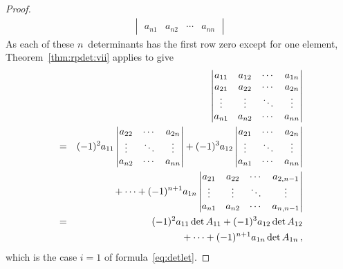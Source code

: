 \begin{proof}
\begin{eqnarray*}
\begin{vmatrix}
\\ a_{n1}&a_{n2}&\cdots&a_{nn}
\end{vmatrix}
\end{eqnarray*}
As each of these \(n\)~determinants has the first row zero except for one element,  Theorem~\ref{thm:rpdet:vii} applies to give
\begin{eqnarray*}
&&\hspace{-1em}
\begin{vmatrix} a_{11}&a_{12}&\cdots&a_{1n}
\\ a_{21}&a_{22}&\cdots&a_{2n}
\\ \vdots&\vdots&\ddots&\vdots
\\ a_{n1}&a_{n2}&\cdots&a_{nn}
\end{vmatrix}
\\&=&
(-1)^2a_{11}\begin{vmatrix} 
 a_{22}&\cdots&a_{2n}
\\ \vdots&\ddots&\vdots
\\ a_{n2}&\cdots&a_{nn}
\end{vmatrix}
+(-1)^3a_{12}\begin{vmatrix} 
 a_{21}&\cdots&a_{2n}
\\ \vdots&\ddots&\vdots
\\ a_{n1}&\cdots&a_{nn}
\end{vmatrix}
\\&&{}
+\cdots
+(-1)^{n+1}a_{1n}\begin{vmatrix}  
a_{21}&a_{22}&\cdots&a_{2,n-1}
\\ \vdots&\vdots&\ddots&\vdots
\\ a_{n1}&a_{n2}&\cdots&a_{n,n-1}
\end{vmatrix}
\\&=&(-1)^2a_{11}\det A_{11}
+(-1)^3a_{12}\det A_{12}
\\&&{}
+\cdots
+(-1)^{n+1}a_{1n}\det A_{1n}\,,
\end{eqnarray*}
which is the case \(i=1\) of formula~\eqref{eq:detlet}.


\end{proof}
